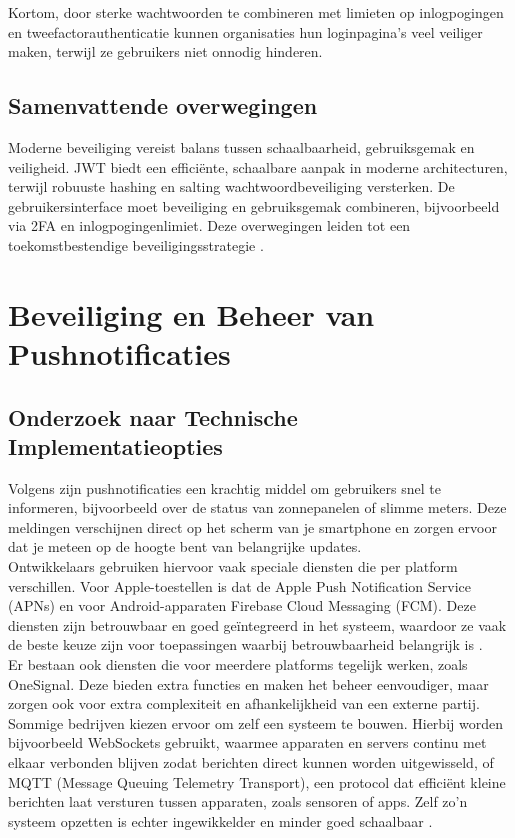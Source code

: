 Kortom, door sterke wachtwoorden te combineren met limieten op inlogpogingen en tweefactorauthenticatie kunnen organisaties hun loginpagina’s veel veiliger maken, terwijl ze gebruikers niet onnodig hinderen.\\

\subsection{Samenvattende overwegingen}
Moderne beveiliging vereist balans tussen schaalbaarheid, gebruiksgemak en veiligheid. JWT biedt een efficiënte, schaalbare aanpak in moderne architecturen, terwijl robuuste hashing en salting wachtwoordbeveiliging versterken. De gebruikersinterface moet beveiliging en gebruiksgemak combineren, bijvoorbeeld via 2FA en inlogpogingenlimiet. Deze overwegingen leiden tot een toekomstbestendige beveiligingsstrategie \autocite{Gao2023, Gupta2022, Arias2025, ReesCarter2024, Chinnasamy2025, Jurisons2024}.

\section{Beveiliging en Beheer van Pushnotificaties}
\label{sec:pushnotificaties}

\subsection{Onderzoek naar Technische Implementatieopties}
Volgens \textcite{Wohllebe2021} zijn pushnotificaties een krachtig middel om gebruikers snel te informeren, bijvoorbeeld over de status van zonnepanelen of slimme meters. Deze meldingen verschijnen direct op het scherm van je smartphone en zorgen ervoor dat je meteen op de hoogte bent van belangrijke updates.\\

Ontwikkelaars gebruiken hiervoor vaak speciale diensten die per platform verschillen. Voor Apple-toestellen is dat de Apple Push Notification Service (APNs) en voor Android-apparaten Firebase Cloud Messaging (FCM). Deze diensten zijn betrouwbaar en goed geïntegreerd in het systeem, waardoor ze vaak de beste keuze zijn voor toepassingen waarbij betrouwbaarheid belangrijk is \autocite{Wohllebe2021}.\\

Er bestaan ook diensten die voor meerdere platforms tegelijk werken, zoals OneSignal. Deze bieden extra functies en maken het beheer eenvoudiger, maar zorgen ook voor extra complexiteit en afhankelijkheid van een externe partij. Sommige bedrijven kiezen ervoor om zelf een systeem te bouwen. Hierbij worden bijvoorbeeld WebSockets gebruikt, waarmee apparaten en servers continu met elkaar verbonden blijven zodat berichten direct kunnen worden uitgewisseld, of MQTT (Message Queuing Telemetry Transport), een protocol dat efficiënt kleine berichten laat versturen tussen apparaten, zoals sensoren of apps. Zelf zo'n systeem opzetten is echter ingewikkelder en minder goed schaalbaar \textcite{Wohllebe2021}.\\

